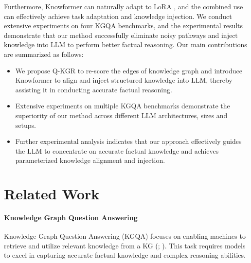 \documentclass[11pt]{article}
\begin{document}
Furthermore, Knowformer can naturally adapt to LoRA \cite{lora}, and the combined use can effectively achieve task adaptation and knowledge injection. 
We conduct extensive experiments on four KGQA benchmarks, and the experimental results demonstrate that our method successfully eliminate noisy pathways and inject knowledge into LLM to perform better factual reasoning.
Our main contributions are summarized as follows:

\begin{itemize}
    \item We propose Q-KGR to re-score the edges of knowledge graph and introduce Knowformer to align and inject structured knowledge into  LLM, thereby assisting it in conducting accurate factual reasoning.
    \item Extensive experiments on multiple KGQA benchmarks demonstrate the superiority of our method across different LLM architectures, sizes and setups.
    \item Further experimental analysis indicates that our approach effectively guides the LLM to concentrate on accurate factual knowledge and achieves parameterized knowledge alignment and injection.
\end{itemize}


\section{Related Work}
\paragraph{Knowledge Graph Question Answering}
Knowledge Graph Question Answering (KGQA) focuses on enabling machines to retrieve and utilize relevant knowledge from a KG (\citealp{cpnet}; \citealp{freebase}). This task requires models to excel in capturing accurate factual knowledge and complex reasoning abilities.
\end{document}
